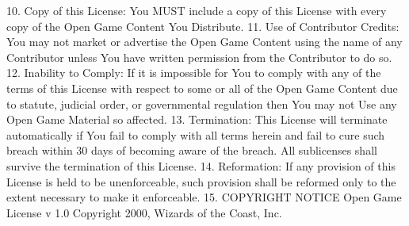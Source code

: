 {10. Copy of this License: You MUST include a copy of this License with every copy of the Open Game Content You Distribute.
11. Use of Contributor Credits: You may not market or advertise the Open Game Content using the name of any Contributor unless You have written permission from the Contributor to do so.
12. Inability to Comply: If it is impossible for You to comply with any of the terms of this License with respect to some or all of the Open Game Content due to statute, judicial order, or governmental regulation then You may not Use any Open Game Material so affected.
13. Termination: This License will terminate automatically if You fail to comply with all terms herein and fail to cure such breach within 30 days of becoming aware of the breach. All sublicenses shall survive the termination of this License.
14. Reformation: If any provision of this License is held to be unenforceable, such provision shall be reformed only to the extent necessary to make it enforceable.
15. COPYRIGHT NOTICE
Open Game License v 1.0 Copyright 2000, Wizards of the Coast, Inc.


} %